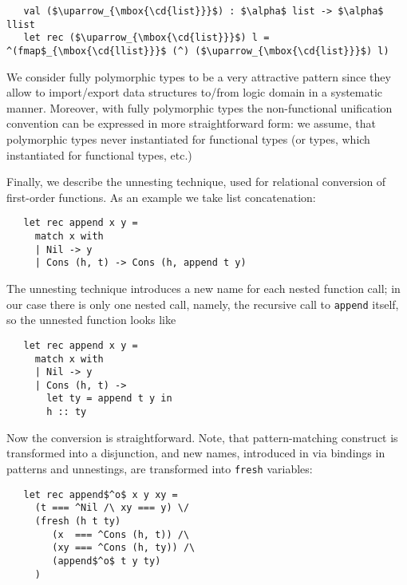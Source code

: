 \begin{lstlisting}
   val ($\uparrow_{\mbox{\cd{list}}}$) : $\alpha$ list -> $\alpha$ llist
   let rec ($\uparrow_{\mbox{\cd{list}}}$) l = ^(fmap$_{\mbox{\cd{llist}}}$ (^) ($\uparrow_{\mbox{\cd{list}}}$) l)
\end{lstlisting}

We consider fully polymorphic types to be a very attractive pattern since they allow to import/export
data structures to/from logic domain in a systematic manner. Moreover, with fully polymorphic types the non-functional
unification convention can be expressed in more straightforward form: we assume, that polymorphic types never
instantiated for functional types (or types, which instantiated for functional types, etc.)

Finally, we describe the unnesting technique, used for relational conversion of first-order functions. As an example we take
list concatenation:

\begin{lstlisting}
   let rec append x y =
     match x with
     | Nil -> y
     | Cons (h, t) -> Cons (h, append t y)
\end{lstlisting}

The unnesting technique introduces a new name for each nested function call; in our case there is only one nested call, namely,
the recursive call to \lstinline|append| itself, so the unnested function looks like

\begin{lstlisting}
   let rec append x y =
     match x with 
     | Nil -> y
     | Cons (h, t) -> 
       let ty = append t y in
       h :: ty
\end{lstlisting}

Now the conversion is straightforward. Note, that pattern-matching construct is transformed into a disjunction, and new names, 
introduced in via bindings in patterns and unnestings, are transformed into \lstinline|fresh| variables:

\begin{lstlisting}
   let rec append$^o$ x y xy =
     (t === ^Nil /\ xy === y) \/
     (fresh (h t ty)
        (x  === ^Cons (h, t)) /\
        (xy === ^Cons (h, ty)) /\
        (append$^o$ t y ty)
     )
\end{lstlisting}






